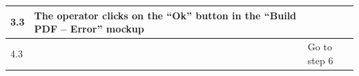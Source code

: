 {{{\begin{table}[h]
\begin{tabular}{|p{2cm}|p{6cm}|p{6cm}|}
			\hline
				\vspace{1mm} 3.3\vspace{1mm} &
				\vspace{1mm} The operator clicks on the “Ok” button in the “Build PDF – Error” mockup\vspace{1mm} & 
				\vspace{1mm} \vspace{1mm} \\
			\hline
				\vspace{1mm} 4.3\vspace{1mm} &
				\vspace{1mm} \vspace{1mm} & 
				\vspace{1mm} Go to step 6\vspace{1mm} \\
			\hline
			\end{tabular}
			\end{table}
			
}}}
